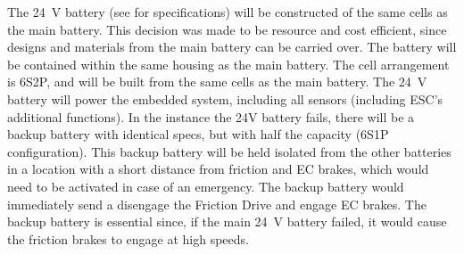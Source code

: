 \documentclass[main.tex]{subfiles}
\begin{document}
    The \SI{24}{V} battery (see  for specifications) will be constructed of the same cells as the main battery. This decision was made to be resource and cost efficient, since designs and materials from the main battery can be carried over. The battery will be contained within the same housing as the main battery. The cell arrangement is 6S2P, and will be built from the same cells as the main battery. The \SI{24}{V} battery will power the embedded system, including all sensors (including ESC’s additional functions). In the instance the 24V battery fails, there will be a backup battery with identical specs, but with half the capacity (6S1P configuration). This backup battery will be held isolated from the other batteries in  a location with a short distance from friction and EC brakes, which would need to be activated in case of an emergency. The backup battery would immediately send a disengage the Friction Drive and engage EC brakes. The backup battery is essential since, if the main \SI{24}{V} battery failed, it would cause the friction brakes to engage at high speeds.\\
\end{document}
